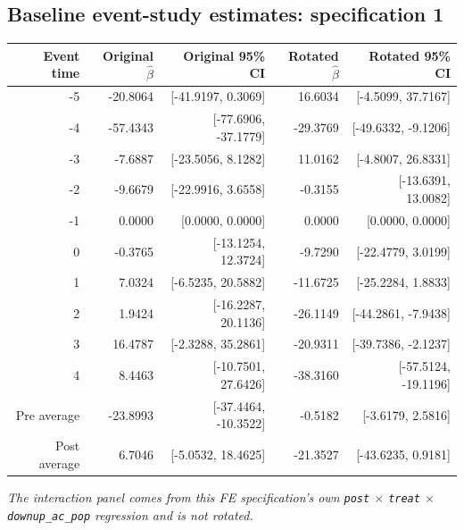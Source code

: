 \documentclass[10pt]{article}
\begin{document}
\subsection*{Baseline event-study estimates: specification 1}
\begin{center}
\scriptsize
\begin{tabular}{r rr rr}
\toprule
Event time & Original $\hat\beta$ & Original 95\% CI & Rotated $\hat\beta$ & Rotated 95\% CI \\
\midrule
-5 & -20.8064 & [-41.9197, 0.3069] & 16.6034 & [-4.5099, 37.7167] \\
-4 & -57.4343 & [-77.6906, -37.1779] & -29.3769 & [-49.6332, -9.1206] \\
-3 & -7.6887 & [-23.5056, 8.1282] & 11.0162 & [-4.8007, 26.8331] \\
-2 & -9.6679 & [-22.9916, 3.6558] & -0.3155 & [-13.6391, 13.0082] \\
-1 & 0.0000 & [0.0000, 0.0000] & 0.0000 & [0.0000, 0.0000] \\
0 & -0.3765 & [-13.1254, 12.3724] & -9.7290 & [-22.4779, 3.0199] \\
1 & 7.0324 & [-6.5235, 20.5882] & -11.6725 & [-25.2284, 1.8833] \\
2 & 1.9424 & [-16.2287, 20.1136] & -26.1149 & [-44.2861, -7.9438] \\
3 & 16.4787 & [-2.3288, 35.2861] & -20.9311 & [-39.7386, -2.1237] \\
4 & 8.4463 & [-10.7501, 27.6426] & -38.3160 & [-57.5124, -19.1196] \\
\midrule
Pre average & -23.8993 & [-37.4464, -10.3522] & -0.5182 & [-3.6179, 2.5816] \\
Post average & 6.7046 & [-5.0532, 18.4625] & -21.3527 & [-43.6235, 0.9181] \\
\bottomrule
\end{tabular}
\end{center}
\medskip
\textit{The interaction panel comes from this FE specification's own \texttt{post} $\times$ \texttt{treat} $\times$ \texttt{downup\_ac\_pop} regression and is not rotated.}
\clearpage
\end{document}
